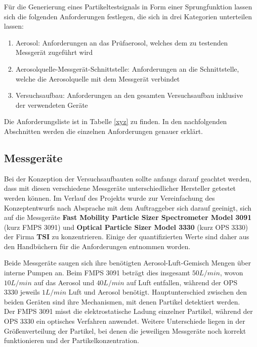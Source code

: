 F\"{u}r die Generierung eines Partikeltestsignals in Form einer Sprungfunktion lassen sich die folgenden Anforderungen festlegen, die sich in drei Kategorien unterteilen lassen:
\begin{enumerate}
	\item Aerosol: Anforderungen an das Pr\"{u}faerosol, welches dem zu testenden Messger\"{a}t zugef\"{u}hrt wird
	\item Aerosolquelle-Messger\"{a}t-Schnittstelle: Anforderungen an die Schnittstelle, welche die Aerosolquelle mit dem Messger\"{a}t verbindet
	\item Versuchsaufbau: Anforderungen an den gesamten Versuchsaufbau inklusive der verwendeten Ger\"{a}te
\end{enumerate}

Die Anforderungsliste ist in Tabelle \ref{xyz} zu finden. In den nachfolgenden Abschnitten werden die einzelnen Anforderungen genauer erkl\"{a}rt.

\subsection{Messger\"{a}te}
Bei der Konzeption der Versuchsaufbauten sollte anfangs darauf geachtet werden, dass mit diesen verschiedene Messger\"{a}te unterschiedlicher Hersteller getestet werden k\"{o}nnen. Im Verlauf des Projekts wurde zur Vereinfachung des Konzeptentwurfs nach Absprache mit dem Auftraggeber sich darauf geeinigt, sich auf die Messger\"{a}te \textbf{Fast Mobility Particle Sizer Spectrometer Model 3091} (kurz FMPS 3091) und \textbf{Optical Particle Sizer Model 3330} (kurz OPS 3330) der Firma \textbf{TSI} zu konzentrieren. Einige der quantifizierten Werte sind daher aus den Handb\"{u}chern f\"{u}r die Anforderungen entnommen worden.

Beide Messger\"{a}te saugen sich ihre ben\"{o}tigten Aerosol-Luft-Gemisch Mengen \"{u}ber interne Pumpen an. Beim FMPS 3091 betr\"{a}gt dies insgesamt $50 L/min$, wovon $10 L/min$ auf das Aerosol und $40 L/min$ auf Luft entfallen, w\"{a}hrend der OPS 3330 jeweils $1 L/min$ Luft und Aerosol ben\"{o}tigt. Hauptunterschied zwischen den beiden Ger\"{a}ten sind ihre Mechanismen, mit denen Partikel detektiert werden. Der FMPS 3091 misst die elektrostatische Ladung einzelner Partikel, w\"{a}hrend der OPS 3330 ein optisches Verfahren anwendet. Weitere Unterschiede liegen in der Gr\"{o}{\ss}enverteilung der Partikel, bei denen die jeweiligen Messger\"{a}te noch korrekt funktionieren und der Partikelkonzentration. 

